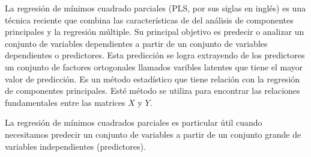 La regresión de mínimos cuadrado parciales (PLS, por sus siglas en inglés) es una técnica reciente que combina las características de del análisis de componentes principales y la regresión múltiple. Su principal objetivo es predecir o analizar un conjunto de variables dependientes a partir de un conjunto de variables dependientes o predictores. Esta predicción se logra extrayendo de los predictores un conjunto de factores ortogonales llamados varibles latentes que tiene el mayor valor de predicción. Es un método estadístico que tiene relación con la regresión de componentes principales. Esté método se utiliza para encontrar las relaciones fundamentales entre las matrices $X$ y $Y$.

La regresión de mínimos cuadrados parciales es particular útil cuando necesitamos predecir un conjunto de variables a partir de un conjunto grande de variables independientes (predictores).  



